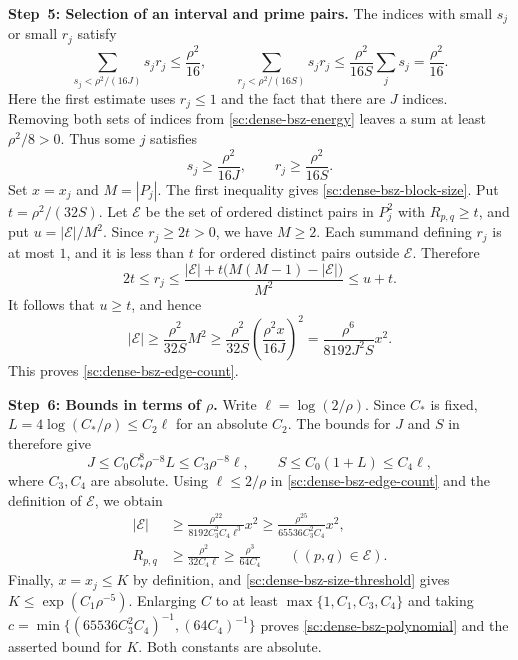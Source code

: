 \documentclass[twoside]{aomart}
\makeatletter
\theoremstyle{paperplain}
\theoremstyle{paperdefinition}
\renewenvironment{proof}[1][\proofname]{\par\pushQED{\qed}%
  \normalfont\topsep6\p@\@plus3\p@\relax\trivlist
  \item[\hskip\labelsep\itshape #1\@addpunct{.}]\ignorespaces
}{\popQED\endtrivlist\@endpefalse}
\numberwithin{equation}{section}
\makeatother
\begin{document}
\begin{proof}
\par
\medskip
\noindent\textbf{Step~5: Selection of an interval and prime pairs.}
The indices with small $s_j$ or small $r_j$ satisfy
\begin{equation*}
 \sum_{s_j<\rho^2/(16J)}s_jr_j\le\frac{\rho^2}{16},
 \qquad
 \sum_{r_j<\rho^2/(16S)}s_jr_j
 \le\frac{\rho^2}{16S}\sum_js_j=\frac{\rho^2}{16}.
 \end{equation*}
Here the first estimate uses $r_j\le1$ and the fact that there
are $J$ indices. Removing both sets of indices from
\eqref{sc:dense-bsz-energy} leaves a sum at least $\rho^2/8>0$.
Thus some $j$ satisfies
\begin{equation*}
 s_j\ge\frac{\rho^2}{16J},\qquad
 r_j\ge\frac{\rho^2}{16S}.
 \end{equation*}
Set $x=x_j$ and $M=|P_j|$. The first inequality gives
\eqref{sc:dense-bsz-block-size}. Put $t=\rho^2/(32S)$.
Let $\mathcal E$ be the set of ordered distinct pairs in $P_j^2$
with $R_{p,q}\ge t$, and put $u=|\mathcal E|/M^2$.
Since $r_j\ge2t>0$, we have $M\ge2$.
Each summand defining $r_j$ is at most $1$, and it is less than
$t$ for ordered distinct pairs outside $\mathcal E$. Therefore
\begin{equation*}
 2t\le r_j
 \le\frac{|\mathcal E|+t\bigl(M(M-1)-|\mathcal E|\bigr)}{M^2}
 \le u+t.
 \end{equation*}
It follows that $u\ge t$, and hence
\begin{equation*}
 |\mathcal E|\ge\frac{\rho^2}{32S}M^2
 \ge\frac{\rho^2}{32S}
       \left(\frac{\rho^2x}{16J}\right)^2
 =\frac{\rho^6}{8192J^2S}x^2.
 \end{equation*}
This proves \eqref{sc:dense-bsz-edge-count}.

\par
\medskip
\noindent\textbf{Step~6: Bounds in terms of $\rho$.}
Write $\ell=\log(2/\rho)$. Since $C_*$ is fixed,
$L=4\log(C_*/\rho)\le C_2\ell$ for an absolute $C_2$.
The bounds for $J$ and $S$ in  therefore give
\begin{equation*}
 J\le C_0C_*^8\rho^{-8}L\le C_3\rho^{-8}\ell,
 \qquad S\le C_0(1+L)\le C_4\ell,
 \end{equation*}
where $C_3,C_4$ are absolute. Using $\ell\le2/\rho$ in
\eqref{sc:dense-bsz-edge-count} and the definition of
$\mathcal E$, we obtain
\begin{equation*}
 \begin{aligned}
 |\mathcal E|
 &\ge\frac{\rho^{22}}{8192C_3^2C_4\ell^3}x^2
  \ge\frac{\rho^{25}}{65536C_3^2C_4}x^2,\\
 R_{p,q}
 &\ge\frac{\rho^2}{32C_4\ell}
  \ge\frac{\rho^3}{64C_4}
  \qquad((p,q)\in\mathcal E).
 \end{aligned}
 \end{equation*}
Finally, $x=x_j\le K$ by definition, and
\eqref{sc:dense-bsz-size-threshold} gives $K\le\exp(C_1\rho^{-5})$.
Enlarging $C$ to at least $\max\{1,C_1,C_3,C_4\}$ and taking
$c=\min\{(65536C_3^2C_4)^{-1},(64C_4)^{-1}\}$ proves
\eqref{sc:dense-bsz-polynomial} and the asserted bound for $K$.
Both constants are absolute.
\end{proof}
\end{document}
